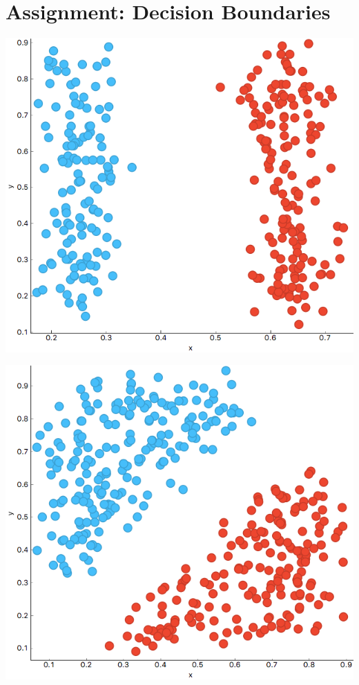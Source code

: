\chapter{Assignment: Decision Boundaries}
\label{hw:decision-boundaries}


\begin{marginfigure}
    \centering
    \includegraphics[width=\linewidth]{A.png}
    \caption{$\;$}
\end{marginfigure}

\begin{marginfigure}
    \centering
    \includegraphics[width=\linewidth]{B.png}
    \caption{$\;$}
\end{marginfigure}

